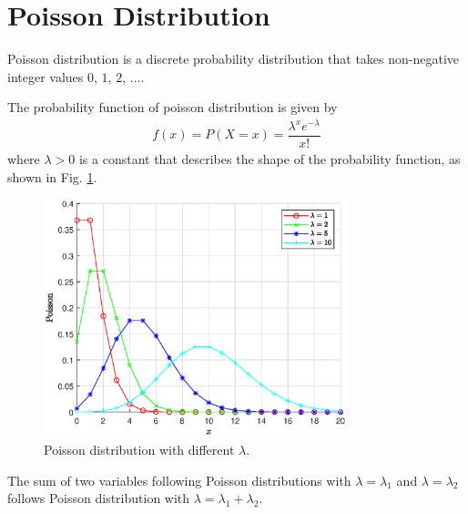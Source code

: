 \section{Poisson Distribution}

Poisson distribution is a discrete probability distribution that takes non-negative integer values $0$, $1$, $2$, $\ldots$.

The probability function of poisson distribution is given by
\begin{eqnarray}
  f(x) = P(X=x) = \dfrac{\lambda^xe^{-\lambda}}{x!} \nonumber
\end{eqnarray}
where $\lambda >0$ is a constant that describes the shape of the probability function, as shown in Fig. \ref{fig:poisson_pmf}.
\begin{figure}
	\centering
	\includegraphics[width=250pt]{chapters/ch-commonly-seen-distributions/figs/poisson_pmf.eps}
	\caption{Poisson distribution with different $\lambda$.} \label{fig:poisson_pmf}
\end{figure}

The sum of two variables following Poisson distributions with $\lambda = \lambda_1$ and $\lambda = \lambda_2$ follows Poisson distribution with $\lambda = \lambda_1 + \lambda_2$.

